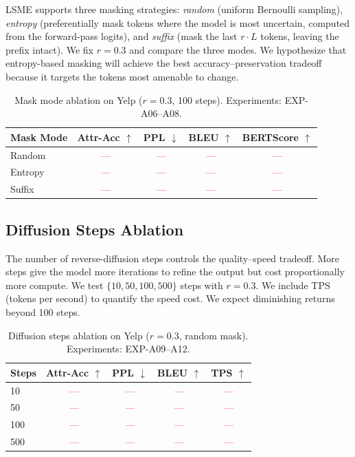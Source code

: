 \documentclass{article}
\newcommand{\tbd}[1]{\textcolor{red}{#1}}  %
\begin{document}
LSME supports three masking strategies: \textit{random} (uniform Bernoulli sampling), \textit{entropy} (preferentially mask tokens where the model is most uncertain, computed from the forward-pass logits), and \textit{suffix} (mask the last $r \cdot L$ tokens, leaving the prefix intact). We fix $r = 0.3$ and compare the three modes. We hypothesize that entropy-based masking will achieve the best accuracy--preservation tradeoff because it targets the tokens most amenable to change.

\begin{table}[h]
\centering
\caption{Mask mode ablation on Yelp ($r=0.3$, 100 steps). Experiments: EXP-A06--A08.}
\label{tab:ablation_mask_mode}
\begin{tabular}{lcccc}
\toprule
\textbf{Mask Mode} & \textbf{Attr-Acc $\uparrow$} & \textbf{PPL $\downarrow$} & \textbf{BLEU $\uparrow$} & \textbf{BERTScore $\uparrow$} \\
\midrule
Random & \tbd{---} & \tbd{---} & \tbd{---} & \tbd{---} \\
Entropy & \tbd{---} & \tbd{---} & \tbd{---} & \tbd{---} \\
Suffix & \tbd{---} & \tbd{---} & \tbd{---} & \tbd{---} \\
\bottomrule
\end{tabular}
\end{table}

\subsection{Diffusion Steps Ablation}

The number of reverse-diffusion steps controls the quality--speed tradeoff. More steps give the model more iterations to refine the output but cost proportionally more compute. We test $\{10, 50, 100, 500\}$ steps with $r = 0.3$. We include TPS (tokens per second) to quantify the speed cost. We expect diminishing returns beyond 100 steps.

\begin{table}[h]
\centering
\caption{Diffusion steps ablation on Yelp ($r=0.3$, random mask). Experiments: EXP-A09--A12.}
\label{tab:ablation_steps}
\begin{tabular}{lcccc}
\toprule
\textbf{Steps} & \textbf{Attr-Acc $\uparrow$} & \textbf{PPL $\downarrow$} & \textbf{BLEU $\uparrow$} & \textbf{TPS $\uparrow$} \\
\midrule
10 & \tbd{---} & \tbd{---} & \tbd{---} & \tbd{---} \\
50 & \tbd{---} & \tbd{---} & \tbd{---} & \tbd{---} \\
100 & \tbd{---} & \tbd{---} & \tbd{---} & \tbd{---} \\
500 & \tbd{---} & \tbd{---} & \tbd{---} & \tbd{---} \\
\bottomrule
\end{tabular}
\end{table}
\end{document}
